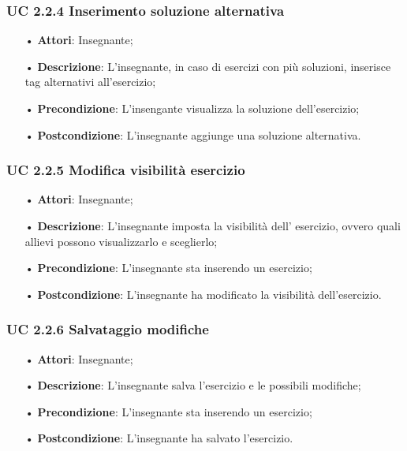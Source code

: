 \subsubsection{UC 2.2.4 Inserimento soluzione alternativa}
\begin{itemize}
	\item[•] \textbf{Attori}: Insegnante;
	\item[•] \textbf{Descrizione}: L'insegnante, in caso di esercizi con più soluzioni, inserisce tag alternativi all’esercizio;
	\item[•] \textbf{Precondizione}: L'insengante visualizza la soluzione dell'esercizio;
	\item[•] \textbf{Postcondizione}: L'insegnante aggiunge una soluzione alternativa.
\end{itemize}

\subsubsection{UC 2.2.5 Modifica visibilità esercizio}
\begin{itemize}
	\item[•] \textbf{Attori}: Insegnante;
	\item[•] \textbf{Descrizione}: L’insegnante imposta la visibilità dell' esercizio, ovvero quali allievi possono visualizzarlo e sceglierlo;
	\item[•] \textbf{Precondizione}: L'insegnante sta inserendo un esercizio;
	\item[•] \textbf{Postcondizione}: L'insegnante ha modificato la visibilità dell'esercizio.
\end{itemize}
\subsubsection{UC 2.2.6 Salvataggio modifiche}
\begin{itemize}
	\item[•] \textbf{Attori}: Insegnante;
	\item[•] \textbf{Descrizione}: L'insegnante salva l'esercizio e le possibili modifiche;
	\item[•] \textbf{Precondizione}: L'insegnante sta inserendo un esercizio;
	\item[•] \textbf{Postcondizione}: L'insegnante ha salvato l'esercizio.
\end{itemize}
